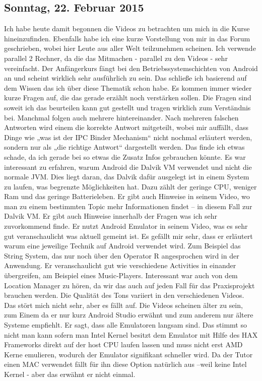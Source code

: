 \documentclass[12pt,a4paper,bibliography=totocnumbered,listof=totocnumbered]{scrartcl}
\begin{document}
\subsection{Sonntag, 22. Februar 2015}
Ich habe heute damit begonnen die Videos zu betrachten um mich in die Kurse hineinzufinden. Ebenfalls habe ich eine kurze Vorstellung von mir in das Forum geschrieben, wobei hier Leute aus aller Welt teilzunehmen scheinen. 
Ich verwende parallel 2 Rechner, da die das Mitmachen - parallel zu den Videos - sehr vereinfacht.
Der Anfängerkurs fängt bei den Betriebssystemschichten von Android an und scheint wirklich sehr ausführlich zu sein. Das schließe ich basierend auf dem Wissen das ich über diese Thematik schon habe. 
Es kommen immer wieder kurze Fragen auf, die das gerade erzählt noch verstärken sollen. Die Fragen sind soweit ich das beurteilen kann gut gestellt und tragen wirklich zum Verständnis bei. Manchmal folgen auch mehrere hintereinander. Nach mehreren falschen Antworten wird einem die korrekte Antwort mitgeteilt, wobei mir auffällt, dass Dinge wie „was ist der IPC Binder Mechanism“ nicht nochmal erläutert werden, sondern nur als „die richtige Antwort“ dargestellt werden. Das finde ich etwas schade, da ich gerade bei so etwas die Zusatz Infos gebrauchen könnte.
Es war interessant zu erfahren, warum Android die Dalvik VM verwendet und nicht die normale JVM. Dies liegt daran, das Dalvik dafür ausgelegt ist in einem System zu laufen, was begrenzte Möglichkeiten hat. Dazu zählt der geringe CPU, weniger Ram und das geringe Batterieleben. 
Er gibt auch Hinweise in seinem Video, wo man zu einem bestimmten Topic mehr Informationen findet – in diesem Fall zur Dalvik VM. Er gibt auch Hinweise innerhalb der Fragen was ich sehr zuvorkommend finde. 
Er nutzt Android Emulator in seinem Video, was es sehr gut veranschaulicht was aktuell gemeint ist. Es gefällt mir sehr, dass er erläutert warum eine jeweilige Technik auf Android verwendet wird. Zum Beispiel das String System, das nur noch über den Operator R angesprochen wird in der Anwendung.
Er veranschaulicht gut wie verschiedene Activities in einander übergreifen, am Beispiel eines Music-Players. Interessant war auch von dem Location Manager zu hören, da wir das auch auf jeden Fall für das Praxisprojekt brauchen werden. 
Die Qualität des Tons variiert in den verschiedenen Videos. Das stört mich nicht sehr, aber es fällt auf. Die Videos scheinen älter zu sein, zum Einem da er nur kurz Android Studio erwähnt und zum anderem nur ältere Systeme empfiehlt. 
Er sagt, dass alle Emulatoren langsam sind. Das stimmt so nicht man kann sofern man Intel Kernel besitzt dem Emulator mit Hilfe des HAX Frameworks direkt auf der host CPU laufen lassen und muss nicht erst AMD Kerne emulieren, wodurch der Emulator signifikant schneller wird. Da der Tutor einen MAC verwendet fällt für ihn diese Option natürlich aus –weil keine Intel Kernel - aber das erwähnt er nicht einmal. 
\end{document}
